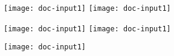 \documentclass{article}
\begin{document}
\texttt{[image: doc-input1]}
\texttt{[image: doc-input1]}

\texttt{[image: doc-input1]}
\texttt{[image: doc-input1]}

\texttt{[image: doc-input1]}


\end{document}
